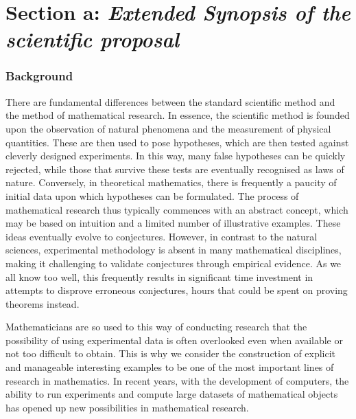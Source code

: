 \section*{Section a: \textit{Extended Synopsis of the scientific proposal}}

\subsubsection*{Background}

There are fundamental differences between the standard scientific method and the method of mathematical research.
In essence, the scientific method is founded upon the observation of natural phenomena and the measurement of physical quantities.
These are then used to pose hypotheses, which are then tested against cleverly designed experiments.
In this way, many false hypotheses can be quickly rejected,
while those that survive these tests are eventually recognised as laws of nature.
Conversely, in theoretical mathematics, there is frequently a paucity of initial data upon which hypotheses can be formulated.
The process of mathematical research thus typically commences with an abstract concept, which may be based on intuition and a limited number of illustrative examples. 
These ideas eventually evolve to conjectures.
However, in contrast to the natural sciences, experimental methodology is absent in many mathematical disciplines, making it challenging to validate conjectures through empirical evidence.
As we all know too well, this frequently results in significant time investment in attempts to disprove erroneous conjectures, hours that could be spent on proving theorems instead.

Mathematicians are so used to this way of conducting research that the possibility of using experimental data is often overlooked even when available or not too difficult to obtain.
This is why we consider the construction of explicit and manageable interesting examples to be one of the most important lines of research in mathematics.
In recent years, with the development of computers, the ability to run experiments and compute large datasets of mathematical objects has opened up new possibilities in mathematical research.

